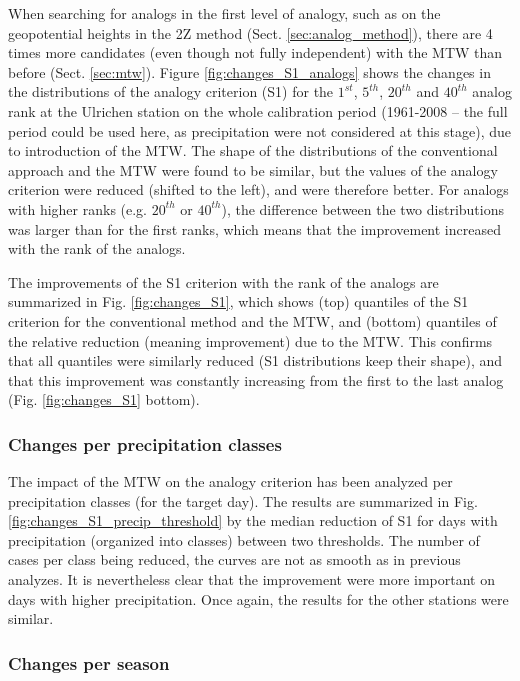 \documentclass[hess, manuscript]{copernicus}
\begin{document}
When searching for analogs in the first level of analogy, such as on the geopotential heights in the 2Z method (Sect. \ref{sec:analog_method}), there are 4 times more candidates (even though not fully independent) with the MTW than before (Sect. \ref{sec:mtw}). Figure \ref{fig:changes_S1_analogs} shows the changes in the distributions of the analogy criterion (S1) for the $1^{st}$, $5^{th}$, $20^{th}$ and $40^{th}$ analog rank at the Ulrichen station on the whole calibration period (1961-2008 -- the full period could be used here, as precipitation were not considered at this stage), due to introduction of the MTW. The shape of the distributions of the conventional approach and the MTW were found to be similar, but the values of the analogy criterion were reduced (shifted to the left), and were therefore better. For analogs with higher ranks (e.g. $20^{th}$ or $40^{th}$), the difference between the two distributions was larger than for the first ranks, which means that the improvement increased with the rank of the analogs. 

The improvements of the S1 criterion with the rank of the analogs are summarized in Fig. \ref{fig:changes_S1}, which shows (top) quantiles of the S1 criterion for the conventional method and the MTW, and (bottom) quantiles of the relative reduction (meaning improvement) due to the MTW. This confirms that all quantiles were similarly reduced (S1 distributions keep their shape), and that this improvement was constantly increasing from the first to the last analog (Fig. \ref{fig:changes_S1} bottom).


\subsubsection{Changes per precipitation classes}
\label{sec:influence_precip}

The impact of the MTW on the analogy criterion has been analyzed per precipitation classes (for the target day). The results are summarized in Fig. \ref{fig:changes_S1_precip_threshold} by the median reduction of S1 for days with precipitation (organized into classes) between two thresholds. The number of cases per class being reduced, the curves are not as smooth as in previous analyzes. It is nevertheless clear that the improvement were more important on days with higher precipitation. Once again, the results for the other stations were similar.


\subsubsection{Changes per season}
\label{sec:seasonal_effect}
\end{document}
